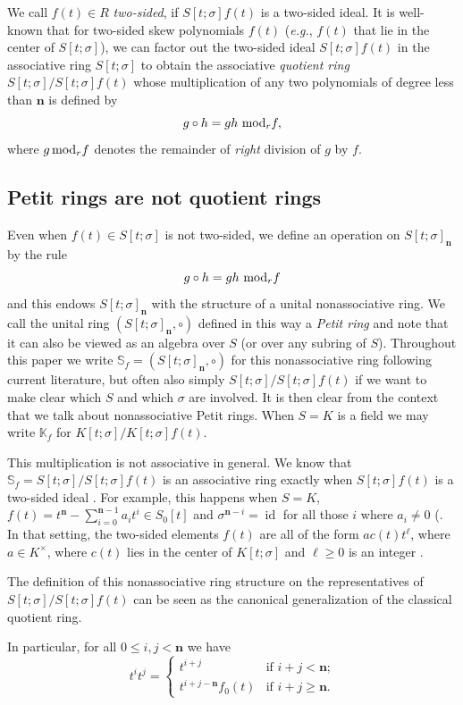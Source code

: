 \documentclass[11pt]{amsart}
\theoremstyle{plain}
\theoremstyle{definition}
\numberwithin{equation}{section}
\numberwithin{figure}{section}
\newcommand{\Sf}{\Stsigma/\Stsigma f(t)} %
\newcommand{\Sfnew}{\mathbb{S}_{f}}
\newcommand{\Kf}{\Ktsigma/\Ktsigma f(t)}
\newcommand{\Kfnew}{\mathbb{K}_{f}}
\newcommand{\ring}{S}
\newcommand{\field}{K}
\newcommand{\Ktsigma}{K[t;\sigma]}
\newcommand{\Stsigma}{S[t;\sigma]}
\DeclareMathOperator{\id}{id}
\newcommand{\de}{\mathbf{n}}  %
\begin{document}
 We call $f(t)\in R$  \emph{two-sided}, if  $\Stsigma f(t)$ is a two-sided ideal. It is well-known that for two-sided skew polynomials $f(t)$ (\emph{e.g.}, $f(t)$ that lie in the center of $\Stsigma$), we can factor out the two-sided ideal $\Stsigma f(t)$  in the associative ring  $\Stsigma $ to obtain the associative \emph{quotient ring } $ \Stsigma/\Stsigma f(t)$ whose multiplication of any two polynomials of degree less than $\de$ is defined by
$$
g\circ h=gh \,\,{\rm mod}_r f,
$$
where $g \,{\rm mod}_r f$ denotes the remainder of  \emph{right} division of $g$ by $f$.


 \subsection{Petit rings are not quotient rings}\label{S:quotient}
Even when $f(t)\in \Stsigma $ is not two-sided, we define an operation on $\Stsigma_\de$ by the rule %
$$
g\circ h=gh \,\,{\rm mod}_r f
$$
and this endows $\Stsigma_\de$ with the structure of a unital nonassociative ring. We call the unital ring $(\Stsigma_\de,\circ)$
 defined in this way a \emph{Petit ring} and note that it can also be viewed as an algebra over $S$ (or  over any subring of $S$). Throughout this paper we write  $\mathbb{S}_f=(\Stsigma_\de,\circ)$ for this nonassociative ring following current literature, but often also simply $\Sf$ if we want to make clear which $S$ and which $\sigma$ are involved. It is then clear from the context that we talk about nonassociative Petit rings.  When $S=K$ is a field we may write $\Kfnew$ for $\Kf$.


This multiplication is not associative in general. 
We know that $\Sfnew=\Sf$
is an associative ring exactly when $\Stsigma f(t)$ is a two-sided ideal \cite{Petit1967}.
 For example, this happens when $\ring=\field$, $f(t)=t^{\de}-\sum_{i=0}^{\de-1}a_it^i\in \ring_0[t]$ and $\sigma^{\de-i}=\id$ for all those $i$ where $a_i\not=0$ (\cite[(15)]{Petit1967}.
 In that setting, the two-sided elements $f(t)$ are all of the form $ac(t)t^\ell$, where $a\in K^\times$, where $c(t)$ lies in the center of $K[t;\sigma]$ and $\ell\geq 0$ is an integer
 \cite[Theorem 1.1.22]{J96}.

The definition of this nonassociative ring structure on the representatives of $\Sf$ can be seen as the canonical generalization of the classical quotient ring.

In particular,  for all $0\leq i,j<\de$ we have
\begin{equation}\label{Equation:tde+1simplified}
t^it^j = \begin{cases}
    t^{i+j} & \text{if $i+j<\de$;}\\
    t^{i+j-\de}f_0(t) & \text{if $i+j\geq \de$.}
\end{cases}
\end{equation}
\end{document}
